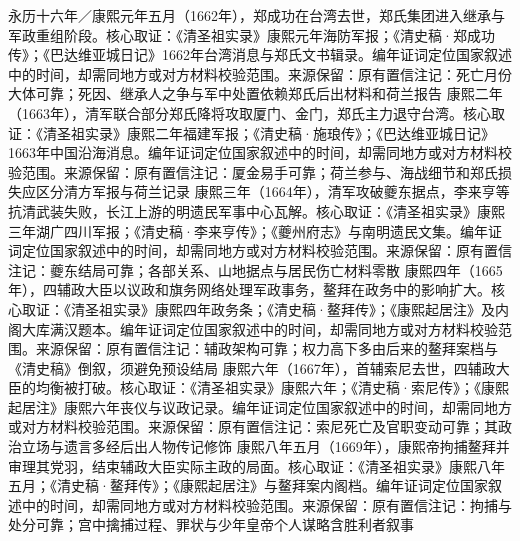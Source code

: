 永历十六年／康熙元年五月（1662年），郑成功在台湾去世，郑氏集团进入继承与军政重组阶段。核心取证：《清圣祖实录》康熙元年海防军报；《清史稿·郑成功传》；《巴达维亚城日记》1662年台湾消息与郑氏文书辑录。编年证词定位国家叙述中的时间，却需同地方或对方材料校验范围。来源保留：原有置信注记：死亡月份大体可靠；死因、继承人之争与军中处置依赖郑氏后出材料和荷兰报告
康熙二年（1663年），清军联合部分郑氏降将攻取厦门、金门，郑氏主力退守台湾。核心取证：《清圣祖实录》康熙二年福建军报；《清史稿·施琅传》；《巴达维亚城日记》1663年中国沿海消息。编年证词定位国家叙述中的时间，却需同地方或对方材料校验范围。来源保留：原有置信注记：厦金易手可靠；荷兰参与、海战细节和郑氏损失应区分清方军报与荷兰记录
康熙三年（1664年），清军攻破夔东据点，李来亨等抗清武装失败，长江上游的明遗民军事中心瓦解。核心取证：《清圣祖实录》康熙三年湖广四川军报；《清史稿·李来亨传》；《夔州府志》与南明遗民文集。编年证词定位国家叙述中的时间，却需同地方或对方材料校验范围。来源保留：原有置信注记：夔东结局可靠；各部关系、山地据点与居民伤亡材料零散
康熙四年（1665年），四辅政大臣以议政和旗务网络处理军政事务，鳌拜在政务中的影响扩大。核心取证：《清圣祖实录》康熙四年政务条；《清史稿·鳌拜传》；《康熙起居注》及内阁大库满汉题本。编年证词定位国家叙述中的时间，却需同地方或对方材料校验范围。来源保留：原有置信注记：辅政架构可靠；权力高下多由后来的鳌拜案档与《清史稿》倒叙，须避免预设结局
康熙六年（1667年），首辅索尼去世，四辅政大臣的均衡被打破。核心取证：《清圣祖实录》康熙六年；《清史稿·索尼传》；《康熙起居注》康熙六年丧仪与议政记录。编年证词定位国家叙述中的时间，却需同地方或对方材料校验范围。来源保留：原有置信注记：索尼死亡及官职变动可靠；其政治立场与遗言多经后出人物传记修饰
康熙八年五月（1669年），康熙帝拘捕鳌拜并审理其党羽，结束辅政大臣实际主政的局面。核心取证：《清圣祖实录》康熙八年五月；《清史稿·鳌拜传》；《康熙起居注》与鳌拜案内阁档。编年证词定位国家叙述中的时间，却需同地方或对方材料校验范围。来源保留：原有置信注记：拘捕与处分可靠；宫中擒捕过程、罪状与少年皇帝个人谋略含胜利者叙事
